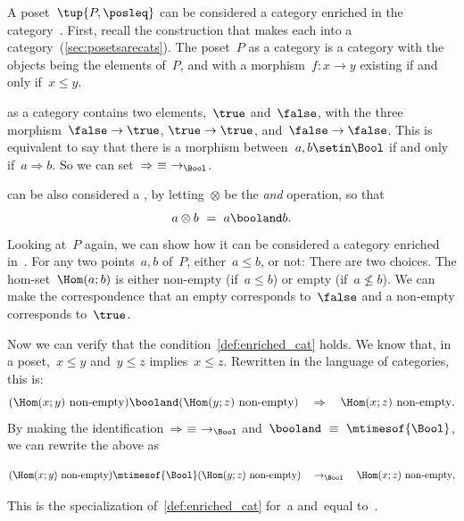     \begin{example}
        A poset~$\tup{P, {\posleq}}$ can be considered a category enriched in the category~\Bool.
        First, recall the construction that makes each  into a category~(\cref{sec:posetsarecats}).
        The poset~$P$ as a category is a category with the objects being the elements of~$P$, and with a morphism~$f\colon x \to y$ existing if and only if~$x\leq y$.

        \Bool as a category contains two elements,~$\true$ and~$\false$, with the three morphism~$\false \to \true$, $\true \to \true$, and~$\false \to \false$.
        This is equivalent to say that there is a morphism between~$a, b \setin \Bool$ if and only if~$a \Rightarrow b$.
        So we can set~$\Rightarrow\ \equiv\ \to_{\Bool}$.

        \Bool can be also considered a , by letting~$\otimes$ be the \emph{and} operation, so that
        \begin{equation}
            a \otimes b\ =\ a \booland b.
        \end{equation}
        Looking at~$P$ again, we can show how it can be considered a category enriched in~\Bool.
        For any two points~$a, b$ of~$P$, either~$a \leq b$, or not: There are two choices.
        The hom-set~$\Hom(a; b)$ is either non-empty (if~$a \leq b$) or empty (if~$a \not\leq b$).
        We can make the correspondence that an empty  corresponds to~$\false$ and a non-empty  corresponds to~$\true$.

        Now we can verify that the condition~\cref{def:enriched_cat} holds.
        We know that, in a poset,~$x \leq y$ and~$y \leq z$ implies~$x \leq z$.
        Rewritten in the language of categories, this is:
        \begin{equation}
            (\Hom(x;y)\ \text{non-empty})
            \booland
            (\Hom(y; z)\ \text{non-empty})
            \quad
            \Rightarrow
            \quad
            \Hom(x; z)\ \text{non-empty}.
        \end{equation}
        By making the identification~$\Rightarrow\ \equiv\ \to_{\Bool}$ and~$\booland\ \equiv\ \mtimesof{\Bool}$, we can rewrite the above as
        \begin{widepar}
            \begin{equation}
                (\Hom(x;y)\ \text{non-empty})
                \mtimesof{\Bool}
                (\Hom(y; z)\ \text{non-empty})
                \quad
                \to_{\Bool}
                \quad
                \Hom(x; z)\ \text{non-empty},
            \end{equation}
        \end{widepar}
        This is the specialization of~\cref{def:enriched_cat} for~\CatC a  and~\CatD equal to~\Bool.
    \end{example}
